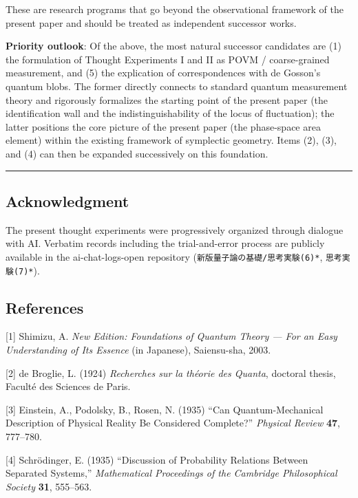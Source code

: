 \documentclass[
  11pt,
]{article}
\begin{document}
These are research programs that go beyond the observational framework
of the present paper and should be treated as independent successor
works.

\textbf{Priority outlook}: Of the above, the most natural successor
candidates are (1) the formulation of Thought Experiments I and II as
POVM / coarse-grained measurement, and (5) the explication of
correspondences with de Gosson's quantum blobs. The former directly
connects to standard quantum measurement theory and rigorously
formalizes the starting point of the present paper (the identification
wall and the indistinguishability of the locus of fluctuation); the
latter positions the core picture of the present paper (the phase-space
area element) within the existing framework of symplectic geometry.
Items (2), (3), and (4) can then be expanded successively on this
foundation.

\begin{center}\rule{0.5\linewidth}{0.5pt}\end{center}

\subsection{Acknowledgment}\label{acknowledgment}

The present thought experiments were progressively organized through
dialogue with AI. Verbatim records including the trial-and-error process
are publicly available in the ai-chat-logs-open repository
(\texttt{新版量子論の基礎/思考実験(6)*}, \texttt{思考実験(7)*}).

\subsection{References}\label{references}

{[}1{]} Shimizu, A. \emph{New Edition: Foundations of Quantum Theory ---
For an Easy Understanding of Its Essence} (in Japanese), Saiensu-sha,
2003.

{[}2{]} de Broglie, L. (1924) \emph{Recherches sur la théorie des
Quanta}, doctoral thesis, Faculté des Sciences de Paris.

{[}3{]} Einstein, A., Podolsky, B., Rosen, N. (1935) ``Can
Quantum-Mechanical Description of Physical Reality Be Considered
Complete?'' \emph{Physical Review} \textbf{47}, 777--780.

{[}4{]} Schrödinger, E. (1935) ``Discussion of Probability Relations
Between Separated Systems,'' \emph{Mathematical Proceedings of the
Cambridge Philosophical Society} \textbf{31}, 555--563.
\end{document}
